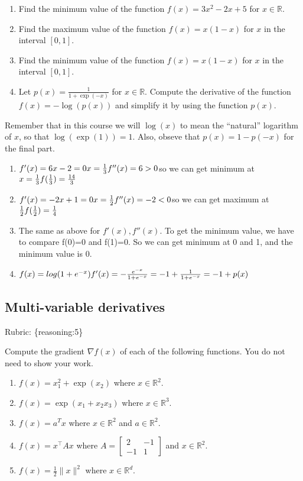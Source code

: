 \documentclass{article}
\def\rubric#1{\gre{Rubric: \{#1\}}}{}
\def\blu#1{{\color{blu}#1}}
\def\gre#1{{\color{gre}#1}}
\def\red#1{{\color{red}#1}}
\def\norm#1{\|#1\|}
\def\R{\mathbb{R}}
\def\enum#1{\begin{enumerate}#1\end{enumerate}}
\begin{document}
\begin{enumerate}
\item Find the minimum value of the function $f(x) = 3x^2 -2x + 5$ for $x \in \R$.
\item Find the maximum value of the function $f(x) = x(1-x)$ for $x$ in the interval $[0,1]$.
\item Find the minimum value of the function $f(x) = x(1-x)$ for $x$ in the interval $[0,1]$.
\item Let $p(x) = \frac{1}{1+\exp(-x)}$ for $x \in \R$. Compute the derivative of the function $f(x) = -\log(p(x))$ and simplify it by using the function $p(x)$.
\end{enumerate}
Remember that in this course we will $\log(x)$ to mean the ``natural'' logarithm of $x$, so that $\log(\exp(1)) = 1$. Also, obseve that $p(x) = 1-p(-x)$ for the final part.
\textcolor{gre}{
\enum{
\item $f'(x)=6x-2=0\\x=\frac{1}{3}\\f''(x)=6>0\\$so we can get minimum at $x=\frac{1}{3}\\f(\frac{1}{3})=\frac{14}{3}$
\item $f'(x)=-2x+1=0\\x=\frac{1}{2}\\f''(x)=-2<0\\$so we can get maximum at $\frac{1}{2}\\f(\frac{1}{2})=\frac{1}{4}$
\item The same as above for $f'(x),f''(x)$. To get the minimum value, we have to compare f(0)=0 and f(1)=0. So we can get minimum at 0 and 1, and the minimum value is 0.
\item $f(x)=log(1+e^{-x})\\f'(x)=-\frac{e^{-x}}{1+e^{-x}}=-1+\frac{1}{1+e^{-x}}=-1+p(x)$
}}
\subsection{Multi-variable derivatives}
\rubric{reasoning:5}

\blu{Compute the gradient $\nabla f(x)$ of each of the following functions.} \red{You do not need to show your work.}
\begin{enumerate}
\item $f(x) = x_1^2 + \exp(x_2)$ where $x \in \R^2$.
\item $f(x) = \exp(x_1 + x_2x_3)$ where $x \in \mathbb{R}^3$.
\item $f(x) = a^Tx$ where $x \in \R^2$ and $a \in \R^2$.
\item $f(x) = x^\top A x$ where $A=\left[ \begin{array}{cc}
2 & -1 \\
 -1 & 1 \end{array} \right]$ and $x \in \mathbb{R}^2$.
 \item $f(x) = \frac{1}{2}\norm{x}^2$ where $x \in \R^d$.
\end{enumerate}
\end{document}
